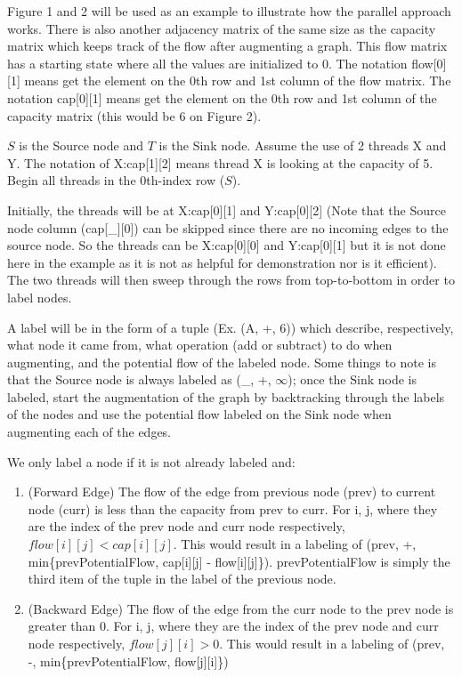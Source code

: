         Figure 1 and 2 will be used as an example to illustrate how the parallel approach works. There is also another adjacency matrix of the same size as the capacity matrix which keeps track of the flow after augmenting a graph. This flow matrix has a starting state where all the values are initialized to 0. The notation flow[0][1] means get the element on the 0th row and 1st column of the flow matrix. The notation cap[0][1] means get the element on the 0th row and 1st column of the capacity matrix (this would be 6 on Figure 2).
        
        
        
        $S$ is the Source node and $T$ is the Sink node. Assume the use of 2 threads X and Y. The notation of X:cap[1][2] means thread X is looking at the capacity of 5. Begin all threads in the 0th-index row ($S$).
        
        
        Initially, the threads will be at X:cap[0][1] and Y:cap[0][2] (Note that the Source node column (cap[\_][0]) can be skipped since there are no incoming edges to the source node. So the threads can be X:cap[0][0] and Y:cap[0][1] but it is not done here in the example as it is not as helpful for demonstration nor is it efficient). The two threads will then sweep through the rows from top-to-bottom in order to label nodes.
        
        A label will be in the form of a tuple (Ex. (A, +, 6)) which describe, respectively, what node it came from, what operation (add or subtract) to do when augmenting, and the potential flow of the labeled node. Some things to note is that the Source node is always labeled as (\_, +, $\infty$); once the Sink node is labeled, start the augmentation of the graph by backtracking through the labels of the nodes and use the potential flow labeled on the Sink node when augmenting each of the edges. \newline
        
        We only label a node if it is not already labeled and:
        \begin{enumerate}
            \item (Forward Edge) The flow of the edge from previous node (prev) to current node (curr) is less than the capacity from prev to curr.\newline
            For i, j, where they are the index of the prev node and curr node respectively, $flow[i][j] < cap[i][j]$. This would result in a labeling of (prev, +, min\{prevPotentialFlow, cap[i][j] - flow[i][j]\}). prevPotentialFlow is simply the third item of the tuple in the label of the previous node.
            \item (Backward Edge) The flow of the edge from the curr node to the prev node is greater than 0.\newline
            For i, j, where they are the index of the prev node and curr node respectively, $flow[j][i] > 0$. This would result in a labeling of (prev, -, min\{prevPotentialFlow, flow[j][i]\})\newline
        \end{enumerate}
        
